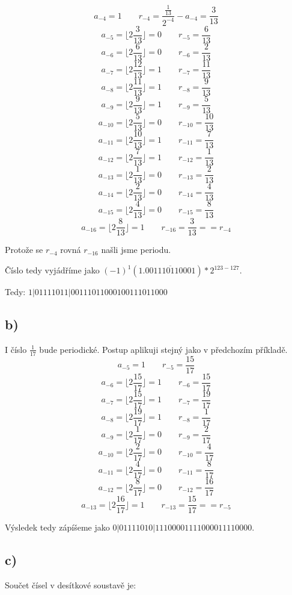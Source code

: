 \documentclass[a4paper, 11pt]{article}
\begin{document}
  $$a_{-4} = 1\qquad r_{-4} = \frac{\frac{1}{13}}{2^{-4}} -a_{-4} = \frac{3}{13}$$
  $$a_{-5} = \lfloor 2\frac{3}{13}\rfloor = 0 \qquad r_{-5} =  \frac{6}{13}$$
  $$a_{-6} = \lfloor 2\frac{6}{13}\rfloor = 0 \qquad r_{-6} =  \frac{2}{13}$$
  $$a_{-7} = \lfloor 2\frac{12}{13}\rfloor = 1 \qquad r_{-7} =  \frac{11}{13}$$
  $$a_{-8} = \lfloor 2\frac{11}{13}\rfloor = 1 \qquad r_{-8} =  \frac{9}{13}$$
  $$a_{-9} = \lfloor 2\frac{9}{13}\rfloor = 1 \qquad r_{-9} =  \frac{5}{13}$$
  $$a_{-10} = \lfloor 2\frac{5}{13}\rfloor = 0 \qquad r_{-10} =  \frac{10}{13}$$
  $$a_{-11} = \lfloor 2\frac{10}{13}\rfloor = 1 \qquad r_{-11} =  \frac{7}{13}$$
  $$a_{-12} = \lfloor 2\frac{7}{13}\rfloor = 1 \qquad r_{-12} =  \frac{1}{13}$$
  $$a_{-13} = \lfloor 2\frac{1}{13}\rfloor = 0 \qquad r_{-13} =  \frac{2}{13}$$
  $$a_{-14} = \lfloor 2\frac{2}{13}\rfloor = 0 \qquad r_{-14} =  \frac{4}{13}$$
  $$a_{-15} = \lfloor 2\frac{4}{13}\rfloor = 0 \qquad r_{-15} =  \frac{8}{13}$$
  $$a_{-16} = \lfloor 2\frac{8}{13}\rfloor = 1 \qquad r_{-16} =  \frac{3}{13} == r_{-4}$$
  
  Protože se $r_{-4}$ rovná $r_{-16}$ našli jsme periodu.
  
  Číslo tedy vyjádříme jako $(-1)^1 (1.\overline{001110110001})*2^{123-127}$.
  
  Tedy: $1|01111011|00111011000100111011000$
  
 \subsection*{b)}
  I číslo $\frac{1}{17}$ bude periodické. Postup aplikuji stejný jako v předchozím příkladě.
  $$a_{-5} = 1  \qquad r_{-5} =  \frac{15}{17}$$
  $$a_{-6} = \lfloor 2\frac{15}{17}\rfloor = 1 \qquad r_{-6} =  \frac{15}{17}$$
  $$a_{-7} = \lfloor 2\frac{15}{17}\rfloor = 1 \qquad r_{-7} =  \frac{19}{17}$$
  $$a_{-8} = \lfloor 2\frac{19}{17}\rfloor = 1 \qquad r_{-8} =  \frac{1}{17}$$
  $$a_{-9} = \lfloor 2\frac{1}{17}\rfloor = 0 \qquad r_{-9} =  \frac{2}{17}$$
  $$a_{-10} = \lfloor 2\frac{2}{17}\rfloor = 0 \qquad r_{-10} =  \frac{4}{17}$$
  $$a_{-11} = \lfloor 2\frac{4}{17}\rfloor = 0 \qquad r_{-11} =  \frac{8}{17}$$
  $$a_{-12} = \lfloor 2\frac{8}{17}\rfloor = 0 \qquad r_{-12} =  \frac{16}{17}$$
  $$a_{-13} = \lfloor 2\frac{16}{17}\rfloor = 1 \qquad r_{-13} =  \frac{15}{17} == r_{-5} $$
  
  Výsledek tedy zápíšeme jako $0|01111010|11100001111000011110000$.
  
  \subsection*{c)}
  Součet čísel v desítkové soustavě je:
  
\end{document}
